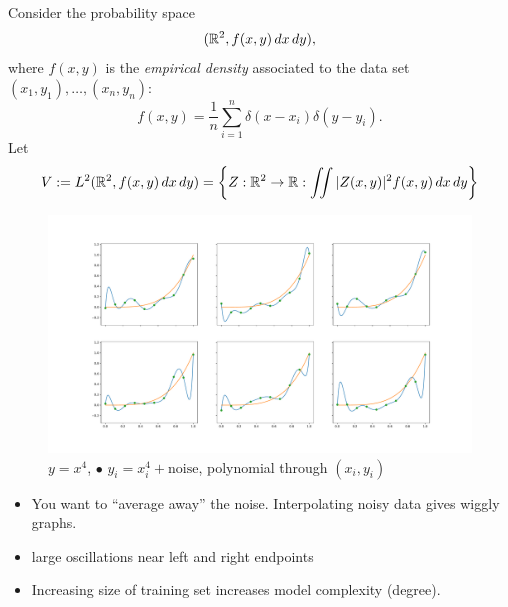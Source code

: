 \documentclass[12pt]{amsart}
\begin{document}
Consider the probability space \[(\mathbb{R}^2, f(x,y)\,dx\,dy),\] where $f(x,y)$ is the \emph{empirical density}
associated to the data set $(x_1,y_1),\ldots,(x_n, y_n)$:
\[
    f(x,y) = \frac1n\sum_{i=1}^n \delta(x - x_i)\delta(y - y_i).
\]
Let
\[
    V := L^2(\mathbb{R}^2, f(x,y)\,dx\,dy) = \left\{Z:\mathbb{R}^2\to \mathbb{R} : \iint |Z(x,y)|^2f(x,y)\,dx\,dy\right\}
\]
\begin{figure}
    \includegraphics[width=1.0\textwidth]{grid.pdf}
    \caption{\orangeline\; $y=x^4$,\; {\color{green}\textbf{$\bullet$}}\; $y_i = x_i^4 + \text{noise}$,\; \blueline\; polynomial through $(x_i, y_i)$ }    
\end{figure}

\begin{itemize}
    \item You want to ``average away'' the noise. Interpolating noisy data gives wiggly graphs.
    \item large oscillations near left and right endpoints
    \item Increasing size of training set increases model complexity (degree).
\end{itemize}
\end{document}
